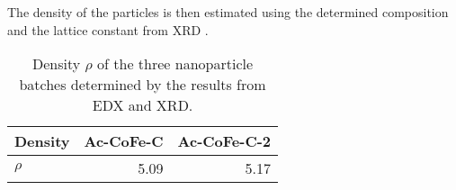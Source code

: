 \documentclass[\main/dresen_thesis.tex]{subfiles}
\begin{document}
  The density of the particles is then estimated using the determined composition and the lattice constant from XRD .

  \begin{table}[ht]
    \centering
    \caption{\label{tab:monolayers:nanoparticles:edx}Density $\rho$ of the three nanoparticle batches determined by the results from EDX and XRD.}
    \begin{tabular}{ l | r | r }
       Density                & \textbf{Ac-CoFe-C} & \textbf{Ac-CoFe-C-2}\\
      \hline
      \rule{0pt}{2ex} $\rho$  & 5.09               & 5.17\\
      \hline
    \end{tabular}
  \end{table}
\end{document}
